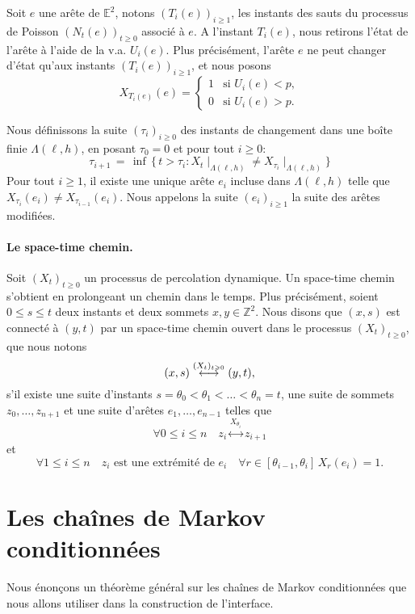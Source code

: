 \documentclass[titlepage,a4paper,12pt]{article}
\begin{document}
Soit $e$ une arête de $\mathbb{E}^2$, notons $(T_i(e))_{i\geqslant 1}$, les instants des sauts du processus de Poisson $(N_t(e))_{t\geqslant 0}$ associé à $e$. A l'instant $T_i(e)$, nous retirons l'état de l'arête à l'aide de la v.a. $U_i(e)$.
Plus précisément, l'arête $e$ ne peut changer d'état qu'aux instants $(T_i(e))_{i\geqslant 1}$, et nous posons 
$$ X_{T_i(e)}(e) = \left\lbrace \begin{array}{cc}
1 & \text{si }U_i(e) < p, \\
0 & \text{si }U_i(e) > p.
\end{array}
\right.
$$

Nous définissons la suite $(\tau_i)_{i\geqslant 0}$ des instants de changement dans une boîte finie $\Lambda(\ell,h)$, en posant $\tau_0 = 0$ et pour tout $i\geqslant 0$:
$$\tau_{i+1} \,=\, \inf \,\big\{ \, t>\tau_i: {X_t}\mid_{ \Lambda(\ell,h)} \neq {X_{\tau_i}}\mid_{ \Lambda(\ell,h)} \big \}
$$
Pour tout $i\geqslant 1$, il existe une unique arête $e_i$ incluse dans $\Lambda(\ell,h)$ telle que $X_{\tau_i}(e_i) \neq X_{\tau_{i-1}}(e_i)$. Nous appelons la suite $(e_i)_{i\geqslant 1}$ la suite des arêtes modifiées.

\paragraph{Le space-time chemin.} Soit $(X_t)_{t\geqslant 0}$ un processus de percolation dynamique. Un space-time chemin s'obtient en prolongeant un chemin dans le temps. Plus précisément, soient $0\leqslant s\leqslant t$ deux instants et deux sommets $x,y\in\mathbb{Z}^2$. Nous disons que $(x,s)$ est connecté à $(y,t)$ par un space-time chemin ouvert dans le processus $(X_t)_{t\geqslant 0}$, que nous notons $$(x,s)\overset{\small(X_t)_{t\geqslant 0}}{\longleftrightarrow} (y,t),$$ s'il existe une suite d'instants $s =\theta_0 <\theta_1 < \dots < \theta_n = t$, une suite de sommets $z_0,\dots, z_{n+1}$ et une suite d'arêtes $e_1,\dots, e_{n-1}$ telles que 
$$ \forall 0 \leqslant i \leqslant n  \quad z_i \overset{X_{\theta_i}}{\longleftrightarrow} z_{i+1}
$$
et $$ \forall 1\leqslant i\leqslant n \quad z_i \text{ est une extrémité de } e_i\quad  \forall r\in  [\theta_{i-1},\theta_i] \,X_r(e_i) = 1.
$$

\section{Les chaînes de Markov conditionnées}
Nous énonçons un théorème général sur les chaînes de Markov conditionnées que nous allons utiliser dans la construction de l'interface.
\end{document}
